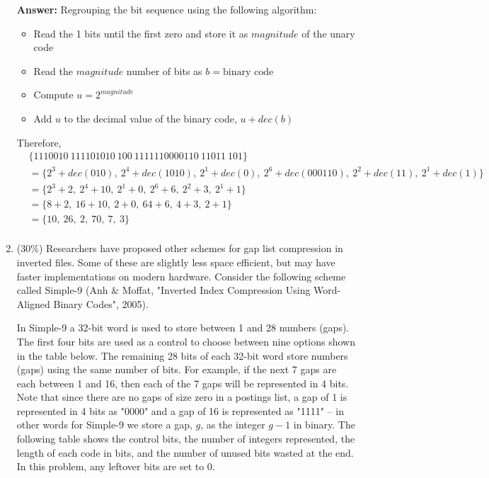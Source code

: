 \documentclass[11pt]{article}
\begin{document}
\begin{enumerate}
        \textbf{Answer:} Regrouping the bit sequence using the following algorithm:
        \begin{itemize}
            \item Read the 1 bits until the first zero and store it as $magnitude$ of the unary code
            \item Read the $magnitude$ number of bits as $b=\text{binary code}$
            \item Compute $u=2^{magnitude}$
            \item Add $u$ to the decimal value of the binary code, $u + dec(b)$
        \end{itemize}

        Therefore,
        \begin{align*}
            &\{1110 010 \ 11110 1010 \ 10 0 \ 1111110 000110 \ 110 11 \ 10 1 \}\\
            &= \{2^3 + dec(010), \ 2^4 +  dec(1010), \ 2^1 + dec(0), \ 2^6 + dec(000110), \ 2^2 + dec(11), \ 2^1 + dec(1)\} \\
            &= \{2^3 + 2, \ 2^4 +  10, \ 2^1 + 0, \ 2^6 + 6, \ 2^2 + 3, \ 2^1 + 1\} \\
            &= \{8 + 2, \ 16 + 10, \ 2 + 0, \ 64 + 6, \ 4 + 3, \ 2 + 1\} \\
            &= \{10, \ 26, \ 2, \ 70, \ 7, \ 3\} \\
        \end{align*}

        \item (30\%) Researchers have proposed other schemes for gap list compression in inverted files. Some of these are slightly less space efficient, but may have faster implementations on modern hardware. Consider the following scheme called Simple-9 (Anh \& Moffat, "Inverted Index Compression Using Word-Aligned Binary Codes", 2005).
        
        In Simple-9 a 32-bit word is used to store between 1 and 28 numbers (gaps). The first four bits are used as a control to choose between nine options shown in the table below. The remaining 28 bits of each 32-bit word store numbers (gaps) using the same number of bits. For example, if the next 7 gaps are each between 1 and 16, then each of the 7 gaps will be represented in 4 bits. Note that since there are no gaps of size zero in a postings list, a gap of 1 is represented in 4 bits as "0000" and a gap of 16 is represented as "1111" -- in other words for Simple-9 we store a gap, $g$, as the integer $g-1$ in binary. The following table shows the control bits, the number of integers represented, the length of each code in bits, and the number of unused bits wasted at the end. In this problem, any leftover bits are set to 0.


\end{enumerate}
\end{document}

